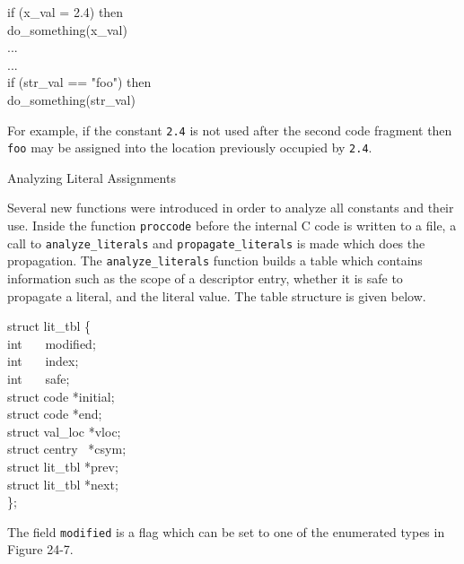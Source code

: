 \begin{iconcode}
\>   if (x\_val = 2.4) then \\
\> \>   do\_something(x\_val) \\
\>   ... \\
\>   ... \\
\>   if (str\_val == "foo") then \\
\> \>   do\_something(str\_val)
\end{iconcode}


For example, if the constant \texttt{2.4} is not used after the second
code fragment then \texttt{{\textquotedbl}foo{\textquotedbl}} may be
assigned into the location previously occupied by \texttt{2.4}.

{\sffamily
Analyzing Literal Assignments}


Several new functions were introduced in order to analyze all
constants and their use. Inside the function \texttt{proccode} before
the internal C code is written to a file, a call to
\texttt{analyze\_literals} and \texttt{propagate\_literals} is made
which does the propagation. The \texttt{analyze\_literals} function
builds a table which contains information such as the scope of a
descriptor entry, whether it is safe to propagate a literal, and the
literal value. The table structure is given below.

\begin{iconcode}
struct lit\_tbl \{ \\
\> int \ \ \ modified; \\
\> int \ \ \ index; \\
\> int \ \ \ safe; \\
\> struct code *initial; \\
\> struct code *end; \\
\> struct val\_loc *vloc; \\
\> struct centry \ *csym; \\
\> struct lit\_tbl *prev; \\
\> struct lit\_tbl *next; \\
\};
\end{iconcode}

The field \texttt{modified} is a flag which can be set to one of the
enumerated types in Figure 24-7.

